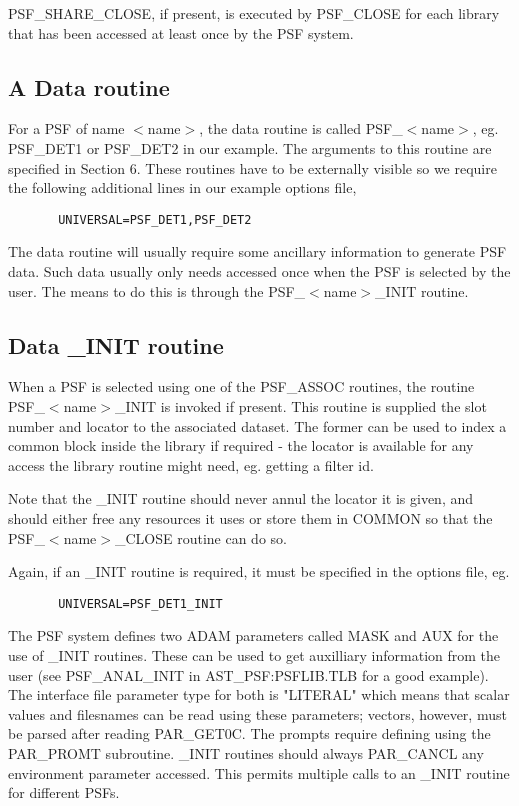      PSF\_SHARE\_CLOSE, if present, is executed by PSF\_CLOSE for each
     library that has been accessed at least once by the PSF system.

\subsection{A Data routine}

     For a PSF of name $<$name$>$, the data routine is called PSF\_$<$name$>$,
     eg. PSF\_DET1 or PSF\_DET2 in our example. The arguments to this
     routine are specified in Section 6. These routines have to be
     externally visible so we require the following additional lines
     in our example options file,

\begin{verbatim}
       UNIVERSAL=PSF_DET1,PSF_DET2
\end{verbatim}

     The data routine will usually require some ancillary information
     to generate PSF data. Such data usually only needs accessed once
     when the PSF is selected by the user. The means to do this is 
     through the PSF\_$<$name$>$\_INIT routine.

\subsection{Data \_INIT routine}

     When a PSF is selected using one of the PSF\_ASSOC routines, the
     routine PSF\_$<$name$>$\_INIT is invoked if present. This routine is
     supplied the slot number and locator to the associated dataset.
     The former can be used to index a common block inside the library
     if required - the locator is available for any access the library
     routine might need, eg. getting a filter id.

     Note that the \_INIT routine should never annul the locator it
     is given, and should either free any resources it uses or store
     them in COMMON so that the PSF\_$<$name$>$\_CLOSE routine can do so.

     Again, if an \_INIT routine is required, it must be specified in
     the options file, eg.

\begin{verbatim}
       UNIVERSAL=PSF_DET1_INIT
\end{verbatim}

     The PSF system defines two ADAM parameters called MASK and AUX
     for the use of \_INIT routines. These can be used to get auxilliary
     information from the user (see PSF\_ANAL\_INIT in AST\_PSF:PSFLIB.TLB
     for a good example). The interface file parameter type for both
     is "LITERAL" which means that scalar values and filesnames can
     be read using these parameters; vectors, however, must be parsed
     after reading PAR\_GET0C. The prompts require defining using the
     PAR\_PROMT subroutine. \_INIT routines should always PAR\_CANCL any
     environment parameter accessed. This permits multiple calls to an
     \_INIT routine for different PSFs.

